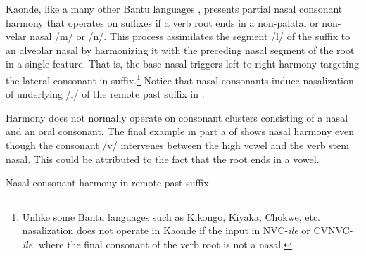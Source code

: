 \documentclass[output=paper]{langsci/langscibook}
\begin{document}
\begin{styleBodyTextIndent}
Kaonde, like a many other Bantu languages \citep{Greenberg1951}, presents partial nasal consonant harmony that operates on suffixes if a verb root ends in a non-palatal or non-velar nasal /m/ or /n/. This process assimilates the segment /l/ of the suffix to an alveolar nasal by harmonizing it with the preceding nasal segment of the root in a single feature. That is, the base nasal triggers left-to-right harmony targeting the lateral consonant in suffix.\footnote{ Unlike some Bantu languages such as Kikongo, Kiyaka, Chokwe, etc. nasalization does not operate in Kaonde if the input in NVC-\textit{ile} or CVNVC-\textit{ile}, where the final consonant of the verb root is not a nasal.  } Notice that nasal consonants induce nasalization of underlying /l/ of the remote past suffix in . 
\end{styleBodyTextIndent}

\begin{styleBodyTextIndent}
Harmony does not normally operate on consonant clusters consisting of a nasal and an oral consonant. The final example in part a of  shows nasal harmony even though the consonant /v/ intervenes between the high vowel and the verb stem nasal. This could be attributed to the fact that the root ends in a vowel. 
\end{styleBodyTextIndent}

\begin{table}
\caption{Nasal consonant harmony in remote past suffix}
\label{tab:4}
\end{table}
\end{document}
